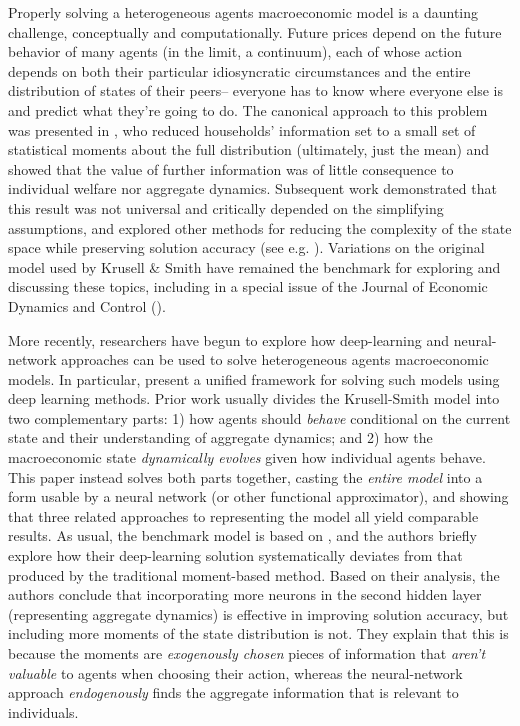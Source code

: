 \documentclass[11pt,pdftex,letterpaper]{article}
\begin{document}
Properly solving a heterogeneous agents macroeconomic model is a daunting challenge, conceptually and computationally. Future prices depend on the future behavior of many agents (in the limit, a continuum), each of whose action depends on both their particular idiosyncratic circumstances and the entire distribution of states of their peers-- everyone has to know where everyone else is and predict what they're going to do. The canonical approach to this problem was presented in \cite{KrusellSmith}, who reduced households' information set to a small set of statistical moments about the full distribution (ultimately, just the mean) and showed that the value of further information was of little consequence to individual welfare nor aggregate dynamics. Subsequent work demonstrated that this result was not universal and critically depended on the simplifying assumptions, and explored other methods for reducing the complexity of the state space while preserving solution accuracy (see e.g. \cite{Reiter2010}). Variations on the original model used by Krusell \& Smith have remained the benchmark for exploring and discussing these topics, including in a special issue of the Journal of Economic Dynamics and Control (\cite{JEDCspecial}).

More recently, researchers have begun to explore how deep-learning and neural-network approaches can be used to solve heterogeneous agents macroeconomic models. In particular, \cite{MALIAR202176} present a unified framework for solving such models using deep learning methods. Prior work usually divides the Krusell-Smith model into two complementary parts: 1) how agents should \textit{behave} conditional on the current state and their understanding of aggregate dynamics; and 2) how the macroeconomic state \textit{dynamically evolves} given how individual agents behave. This paper instead solves both parts together, casting the \textit{entire model} into a form usable by a neural network (or other functional approximator), and showing that three related approaches to representing the model all yield comparable results. As usual, the benchmark model is based on \cite{KrusellSmith}, and the authors briefly explore how their deep-learning solution systematically deviates from that produced by the traditional moment-based method. Based on their analysis, the authors conclude that incorporating more neurons in the second hidden layer (representing aggregate dynamics) is effective in improving solution accuracy, but including more moments of the state distribution is not. They explain that this is because the moments are \textit{exogenously chosen} pieces of information that \textit{aren't valuable} to agents when choosing their action, whereas the neural-network approach \textit{endogenously} finds the aggregate information that is relevant to individuals.
\end{document}
